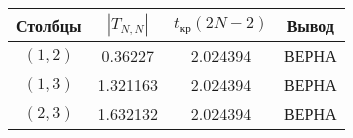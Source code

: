 \begin{changemargin}{-0cm}{0cm}\small{%
\center%
\begin{tabular}{|c|c|c|c|}%
\hline%
Столбцы&$|T_{N,N}|$&$t_{\text{кр}} (2N-2)$&Вывод\\%
\hline%
$(1,2)$&0.36227&2.024394&ВЕРНА\\%
\hline%
$(1,3)$&1.321163&2.024394&ВЕРНА\\%
\hline%
$(2,3)$&1.632132&2.024394&ВЕРНА\\%
\hline%
\end{tabular}%
\newline%
\newline%
%
}\end{changemargin}
